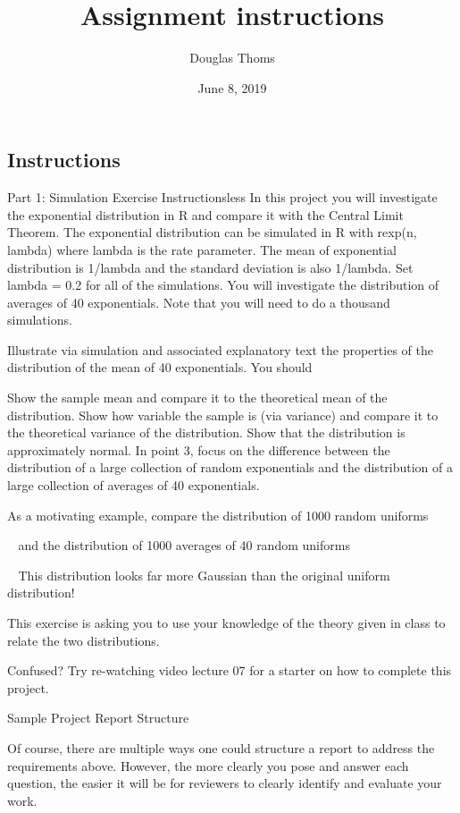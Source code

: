 \documentclass[]{article}
\title{Assignment instructions}
\author{Douglas Thoms}
\date{June 8, 2019}
\begin{document}
\maketitle

\hypertarget{instructions}{%
\subsection{Instructions}\label{instructions}}

Part 1: Simulation Exercise Instructionsless In this project you will
investigate the exponential distribution in R and compare it with the
Central Limit Theorem. The exponential distribution can be simulated in
R with rexp(n, lambda) where lambda is the rate parameter. The mean of
exponential distribution is 1/lambda and the standard deviation is also
1/lambda. Set lambda = 0.2 for all of the simulations. You will
investigate the distribution of averages of 40 exponentials. Note that
you will need to do a thousand simulations.

Illustrate via simulation and associated explanatory text the properties
of the distribution of the mean of 40 exponentials. You should

Show the sample mean and compare it to the theoretical mean of the
distribution. Show how variable the sample is (via variance) and compare
it to the theoretical variance of the distribution. Show that the
distribution is approximately normal. In point 3, focus on the
difference between the distribution of a large collection of random
exponentials and the distribution of a large collection of averages of
40 exponentials.

As a motivating example, compare the distribution of 1000 random
uniforms

 and the distribution of 1000 averages of 40 random uniforms

 This distribution looks far more Gaussian than the original uniform
distribution!

This exercise is asking you to use your knowledge of the theory given in
class to relate the two distributions.

Confused? Try re-watching video lecture 07 for a starter on how to
complete this project.

Sample Project Report Structure

Of course, there are multiple ways one could structure a report to
address the requirements above. However, the more clearly you pose and
answer each question, the easier it will be for reviewers to clearly
identify and evaluate your work.
\end{document}

